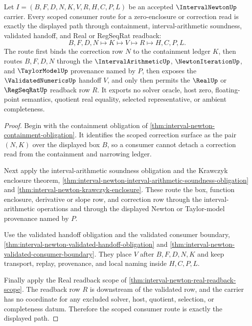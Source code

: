 \begin{theorem}
\label{thm:interval-newton-scoped-consumer-route}
Let $I=(B,F,D,N,K,V,R,H,C,P,L)$ be an accepted $\IntervalNewtonUp$ carrier. Every scoped consumer route for a zero-enclosure or correction read is exactly the displayed path through containment, interval-arithmetic soundness, validated handoff, and Real or RegSeqRat readback:
$$
B,F,D,N \longmapsto K \longmapsto V \longmapsto R \longmapsto H,C,P,L .
$$
The route first binds the correction row $N$ to the containment ledger $K$, then routes $B,F,D,N$ through the $\IntervalArithmeticUp$, $\NewtonIterationUp$, and $\TaylorModelUp$ provenance named by $P$, then exposes the $\ValidatedNumericsUp$ handoff $V$, and only then permits the $\RealUp$ or $\RegSeqRatUp$ readback row $R$. It exports no solver oracle, host zero, floating-point semantics, quotient real equality, selected representative, or ambient completeness.
\end{theorem}
\begin{proof}
Begin with the containment obligation of \autoref{thm:interval-newton-containment-obligation}. It identifies the scoped correction surface as the pair $(N,K)$ over the displayed box $B$, so a consumer cannot detach a correction read from the containment and narrowing ledger.

Next apply the interval-arithmetic soundness obligation and the Krawczyk enclosure theorem, \autoref{thm:interval-newton-interval-arithmetic-soundness-obligation} and \autoref{thm:interval-newton-krawczyk-enclosure}. These route the box, function enclosure, derivative or slope row, and correction row through the interval-arithmetic operations and through the displayed Newton or Taylor-model provenance named by $P$.

Use the validated handoff obligation and the validated consumer boundary, \autoref{thm:interval-newton-validated-handoff-obligation} and \autoref{thm:interval-newton-validated-consumer-boundary}. They place $V$ after $B,F,D,N,K$ and keep transport, replay, provenance, and local naming inside $H,C,P,L$.

Finally apply the Real readback scope of \autoref{thm:interval-newton-real-readback-scope}. The readback row $R$ is downstream of the validated row, and the carrier has no coordinate for any excluded solver, host, quotient, selection, or completeness datum. Therefore the scoped consumer route is exactly the displayed path.
\end{proof}

